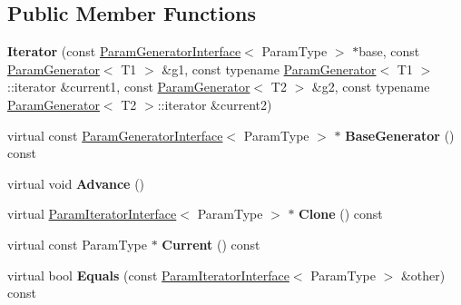 \subsection*{Public Member Functions}
\begin{DoxyCompactItemize}
\item 
\mbox{\label{classtesting_1_1internal_1_1_cartesian_product_generator2_1_1_iterator_a6a8a81b732c307be9873156ef51c88e4}} 
{\bfseries Iterator} (const \mbox{\hyperlink{classtesting_1_1internal_1_1_param_generator_interface}{Param\+Generator\+Interface}}$<$ Param\+Type $>$ $\ast$base, const \mbox{\hyperlink{classtesting_1_1internal_1_1_param_generator}{Param\+Generator}}$<$ T1 $>$ \&g1, const typename \mbox{\hyperlink{classtesting_1_1internal_1_1_param_generator}{Param\+Generator}}$<$ T1 $>$\+::iterator \&current1, const \mbox{\hyperlink{classtesting_1_1internal_1_1_param_generator}{Param\+Generator}}$<$ T2 $>$ \&g2, const typename \mbox{\hyperlink{classtesting_1_1internal_1_1_param_generator}{Param\+Generator}}$<$ T2 $>$\+::iterator \&current2)
\item 
\mbox{\label{classtesting_1_1internal_1_1_cartesian_product_generator2_1_1_iterator_afb2a3e49b097b84cbb72e9c6610d1028}} 
virtual const \mbox{\hyperlink{classtesting_1_1internal_1_1_param_generator_interface}{Param\+Generator\+Interface}}$<$ Param\+Type $>$ $\ast$ {\bfseries Base\+Generator} () const
\item 
\mbox{\label{classtesting_1_1internal_1_1_cartesian_product_generator2_1_1_iterator_a05c85fc3b501fa28fd87fee29a9a794e}} 
virtual void {\bfseries Advance} ()
\item 
\mbox{\label{classtesting_1_1internal_1_1_cartesian_product_generator2_1_1_iterator_a16549ce07f407867686a630e44afea0b}} 
virtual \mbox{\hyperlink{classtesting_1_1internal_1_1_param_iterator_interface}{Param\+Iterator\+Interface}}$<$ Param\+Type $>$ $\ast$ {\bfseries Clone} () const
\item 
\mbox{\label{classtesting_1_1internal_1_1_cartesian_product_generator2_1_1_iterator_ad10d8850b4b02fb7a8d3c9b4cab113fb}} 
virtual const Param\+Type $\ast$ {\bfseries Current} () const
\item 
\mbox{\label{classtesting_1_1internal_1_1_cartesian_product_generator2_1_1_iterator_afcf168334da4c571f8628b08006cf920}} 
virtual bool {\bfseries Equals} (const \mbox{\hyperlink{classtesting_1_1internal_1_1_param_iterator_interface}{Param\+Iterator\+Interface}}$<$ Param\+Type $>$ \&other) const
\end{DoxyCompactItemize}
